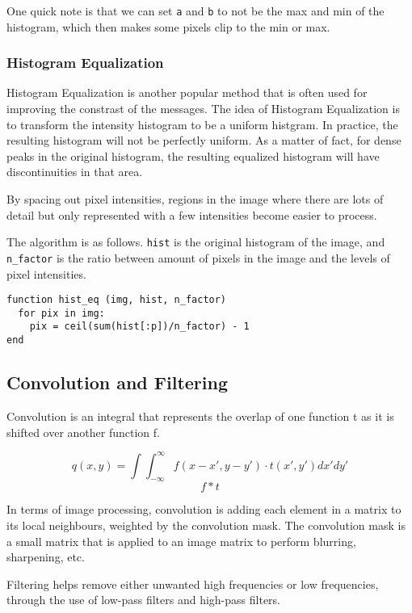 \documentclass{article}
\begin{document}
\begin{multicols}{2}
One quick note is that we can set \texttt{a} and \texttt{b} to not be the max and min of the histogram, which then makes some pixels clip to the min or max.

\subsubsection{Histogram Equalization}

Histogram Equalization is another popular method that is often used for improving the constrast of the messages. The idea of Histogram Equalization is to transform the intensity histogram to be a uniform histgram. In practice, the resulting histogram will not be perfectly uniform. As a matter of fact, for dense peaks in the original histogram, the resulting equalized histogram will have discontinuities in that area.

By spacing out pixel intensities, regions in the image where there are lots of detail but only represented with a few intensities become easier to process.

The algorithm is as follows. \texttt{hist} is the original histogram of the image, and \texttt{n\_factor} is the ratio between amount of pixels in the image and the levels of pixel intensities. 

\begin{verbatim}
function hist_eq (img, hist, n_factor)
  for pix in img:
    pix = ceil(sum(hist[:p])/n_factor) - 1
end
\end{verbatim}

\subsection{Convolution and Filtering} 

Convolution is an integral that represents the overlap of one function t as it is shifted over another function f.

\[q(x,y) = \int \int_{-\infty}^{\infty} f(x-x', y-y') \cdot t(x',y') dx'dy'\]
\[f * t\]

In terms of image processing, convolution is adding each element in a matrix to its local neighbours, weighted by the convolution mask. The convolution mask is a small matrix that is applied to an image matrix to perform blurring, sharpening, etc.

Filtering helps remove either unwanted high frequencies or low frequencies, through the use of low-pass filters and high-pass filters.


\end{multicols}
\end{document}
